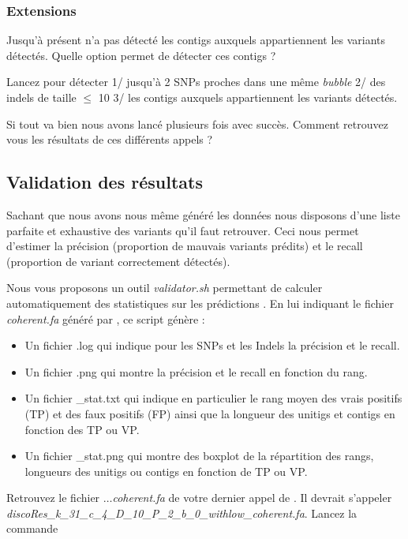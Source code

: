 \subsubsection*{Extensions}
\qu Jusqu'à présent \discopp n'a pas détecté les contigs auxquels appartiennent les variants détectés. Quelle option permet de détecter ces contigs ? 

\qu Lancez \discopp pour détecter 1/ jusqu'à 2 SNPs proches dans une même \emph{bubble} 2/ des indels de taille $\leq$ 10 3/ les contigs auxquels appartiennent les variants détectés.

\qu Si tout va bien nous avons lancé plusieurs fois \discopp avec succès. Comment retrouvez vous les résultats de ces différents appels ? 

\subsection*{Validation des résultats}
Sachant que nous avons nous même généré les données nous disposons d'une liste parfaite et exhaustive des variants qu'il faut retrouver. Ceci nous permet d'estimer la précision (proportion de mauvais variants prédits) et le recall (proportion de variant correctement détectés).

Nous vous proposons un outil \emph{validator.sh} permettant de calculer automatiquement des statistiques sur les prédictions \discopp. En lui indiquant le fichier \emph{coherent.fa} généré par \discopp, ce script génère :
\begin{itemize}
       \item Un fichier .log qui indique pour les SNPs et les Indels la précision et le recall. 
       \item Un fichier .png qui montre la précision et le recall en fonction du rang. 
       \item Un fichier \_stat.txt qui indique en particulier le rang moyen des vrais positifs (TP) et des faux positifs (FP) ainsi que la longueur des unitigs et contigs en fonction des TP ou VP.
       \item Un fichier \_stat.png qui montre des boxplot de la répartition des rangs, longueurs des unitigs ou contigs en fonction de TP ou VP.
\end{itemize}

\qu Retrouvez le fichier \emph{$\dots$coherent.fa} de votre dernier appel de \discopp. Il devrait s'appeler \emph{discoRes\_k\_31\_c\_4\_D\_10\_P\_2\_b\_0\_withlow\_coherent.fa}. Lancez la commande 

